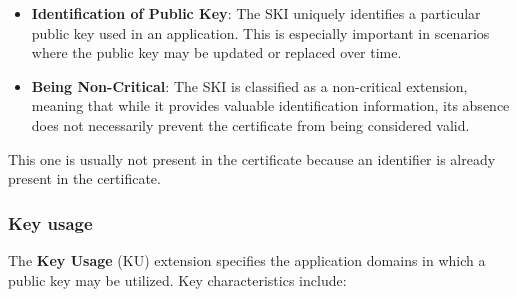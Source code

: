 \begin{itemize}
  \item \textbf{Identification of Public Key}: The SKI uniquely
    identifies a particular public key used in an application. This
    is especially important in scenarios where the public key may be
    updated or replaced over time.

  \item \textbf{Being Non-Critical}: The SKI is classified as a
    non-critical extension, meaning that while it provides valuable
    identification information, its absence does not necessarily
    prevent the certificate from being considered valid.
\end{itemize}
This one is usually not present in the certificate because an
identifier is already present in the certificate.
\subsubsection{Key usage}

The \textbf{Key Usage} (KU) extension specifies the application
domains in which a public key may be utilized. Key characteristics
include:

